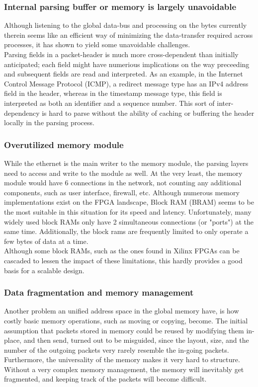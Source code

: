 \subsubsection{Internal parsing buffer or memory is largely unavoidable}
Although listening to the global data-bus and processing on the bytes currently
therein  seems like an efficient way of minimizing the data-transfer required
across processes, it has shown to yield some unavoidable challenges.\\
Parsing fields in a packet-header is much more cross-dependent than initially
anticipated; each field might have numerious implications on the way preceeding
and subsequent fields are read and interpreted. As an example, in the Internet
Control Message Protocol (ICMP), a redirect message type has an IPv4 address field in
the header, whereas in the timestamp message type, this field is interpreted as
both an identifier and a sequence number.
This sort of inter-dependency is hard to parse without the ability of caching
or buffering the header locally in the parsing process.

\subsubsection{Overutilized memory module}
While the ethernet is the main writer to the memory module, the parsing layers
need to access and write to the module as well. At the very least, the memory
module would have 6 connections in the network, not counting any additional
components, such as user interface, firewall, etc.
Although numerous memory implementations exist on the FPGA landscape, Block RAM
(BRAM) seems to be the most suitable in this situation for its speed and latency.
Unfortunately, many widely used block RAMs only have 2 simultaneous connections
(or "ports") at the same time. Additionally, the block rams are frequently
limited to only operate a few bytes of data at a time.\\
Although some block RAMs, such as the ones found in Xilinx FPGAs can be cascaded\cite{xilinx_fpga_memory_resources}
to lessen the impact of these limitations, this hardly provides a good basis for
a scalable design.

\subsubsection{Data fragmentation and memory management}
Another problem an unified address space in the global memory have, is how costly
basic memory operations, such as moving or copying, become. The initial
assumption that packets stored in memory could be reused by modifying them
in-place, and then send, turned out to be misguided, since the layout, size, and
the number of the outgoing packets very rarely resemble the in-going packets.\\
Furthermore, the universality of the memory makes it very hard to
structure. Without a very complex memory management, the memory will inevitably
get fragmented, and keeping track of the packets will become difficult.


